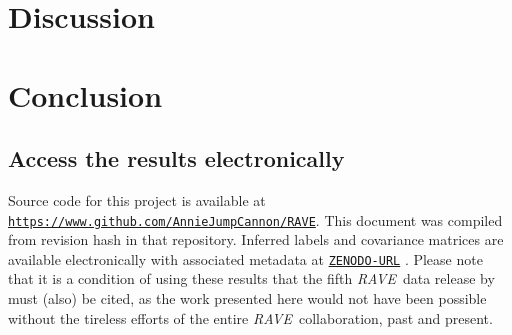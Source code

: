 \documentclass[preprint,trackchanges]{aastex}
\newcommand{\acronym}[1]{{\small{#1}}}
\newcommand{\project}[1]{\textsl{#1}}
\newcommand{\rave}{\project{\acronym{RAVE}}}
\newcommand{\teff}{T_{\mathrm{eff}}}
\newcommand{\logg}{\log g}
\newcommand{\Nstars}{483,330}
\begin{document}
\section{Discussion}
\label{sec:discussion}





\section{Conclusion}
\label{sec:conclusion}



\subsection*{Access the results electronically}

Source code for this project is available at \texttt{\url{https://www.github.com/AnnieJumpCannon/RAVE}}.  
This document was compiled from revision hash \texttt{\githash} in that repository.
Inferred labels and covariance matrices are available electronically with 
associated metadata at \texttt{\url{ZENODO-URL}} \citep{DATA_REPOSITORY}.  
Please note that it is a condition of using these results that the fifth \rave\ 
data release by \citet{Kunder_2016} must (also) be cited, as the work presented 
here would not have been possible without the tireless efforts of the entire 
\rave\ collaboration, past and present.
\end{document}
